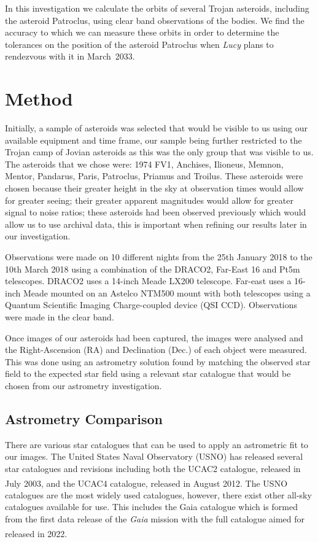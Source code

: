\documentclass[10pt, twocolumn]{revtex4}    %
\newcommand{\scite}[1]{\textsuperscript{\cite{#1}}}
\begin{document}
In this investigation we calculate the orbits of several Trojan asteroids, including the asteroid Patroclus, using clear band observations of the bodies. We find the accuracy to which we can measure these orbits in order to determine the tolerances on the position of the asteroid Patroclus when \textit{Lucy} plans to rendezvous with it in March~2033.

\section{Method}

Initially, a sample of asteroids was selected that would be visible to us using our available equipment and time frame, our sample being further restricted to the Trojan camp of Jovian asteroids as this was the only group that was visible to us. The asteroids that we chose were: 1974 FV1, Anchises, Ilioneus, Memnon, Mentor, Pandarus, Paris, Patroclus, Priamus and Troilus. These asteroids were chosen because their greater height in the sky at observation times would allow for greater seeing; their greater apparent magnitudes would allow for greater signal to noise ratios; these asteroids had been observed previously which would allow us to use archival data, this is important when refining our results later in our investigation.

Observations were made on 10 different nights from the 25th January 2018 to the 10th March 2018 using a combination of the DRACO2, Far-East 16 and Pt5m telescopes. DRACO2 uses a 14-inch Meade LX200 telescope. Far-east uses a 16-inch Meade mounted on an Astelco NTM500 mount with both telescopes using a Quantum Scientific Imaging Charge-coupled device (QSI CCD). Observations were made in the clear band.

Once images of our asteroids had been captured, the images were analysed and the Right-Ascension (RA) and Declination (Dec.) of each object were measured. This was done using an astrometry solution found by matching the observed star field to the expected star field using a relevant star catalogue that would be chosen from our astrometry investigation. 

\subsection*{Astrometry Comparison}

There are various star catalogues that can be used to apply an astrometric fit to our images. The United States Naval Observatory (USNO) has released several star catalogues and revisions including both the UCAC2 catalogue, released in July 2003, and the UCAC4 catalogue, released in August 2012.\scite{ZachariassecondUSNaval2004}\scite{ZachariasFourthUSNaval2012} The USNO catalogues are the most widely used catalogues, however, there exist other all-sky catalogues available for use. This includes the Gaia catalogue which is formed from the first data release of the \textit{Gaia} mission with the full catalogue aimed for released in 2022.\scite{GaiaCollaborationGaiaDataRelease2016}
\end{document}

